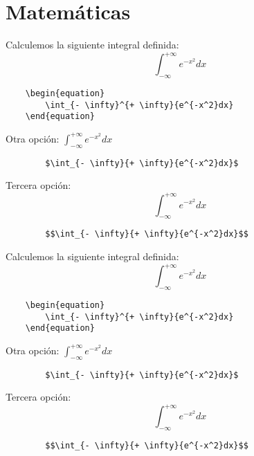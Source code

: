 \section{Matemáticas}

\begin{frame}[fragile]
    Calculemos la siguiente integral definida:
    \begin{equation}
        \int_{- \infty}^{+ \infty}{e^{-x^2}dx}
    \end{equation}
    \begin{verbatim}
    \begin{equation}
        \int_{- \infty}^{+ \infty}{e^{-x^2}dx}
    \end{equation}
    \end{verbatim}
    Otra opción: $\int_{- \infty}^{+ \infty}{e^{-x^2}dx}$
    \begin{verbatim}
        $\int_{- \infty}{+ \infty}{e^{-x^2}dx}$
    \end{verbatim}
    Tercera opción: $$\int_{- \infty}^{+ \infty}{e^{-x^2}dx}$$
    \begin{verbatim}
        $$\int_{- \infty}{+ \infty}{e^{-x^2}dx}$$
    \end{verbatim}
\end{frame}

\begin{frame}[fragile]
    Calculemos la siguiente integral definida:
    \begin{equation*}
        \int_{- \infty}^{+ \infty}{e^{-x^2}dx}
    \end{equation*}
    \begin{verbatim}
    \begin{equation}
        \int_{- \infty}^{+ \infty}{e^{-x^2}dx}
    \end{equation}
    \end{verbatim}
    Otra opción: $\int_{- \infty}^{+ \infty}{e^{-x^2}dx}$
    \begin{verbatim}
        $\int_{- \infty}{+ \infty}{e^{-x^2}dx}$
    \end{verbatim}
    Tercera opción: $$\int_{- \infty}^{+ \infty}{e^{-x^2}dx}$$
    \begin{verbatim}
        $$\int_{- \infty}{+ \infty}{e^{-x^2}dx}$$
    \end{verbatim}
\end{frame}

